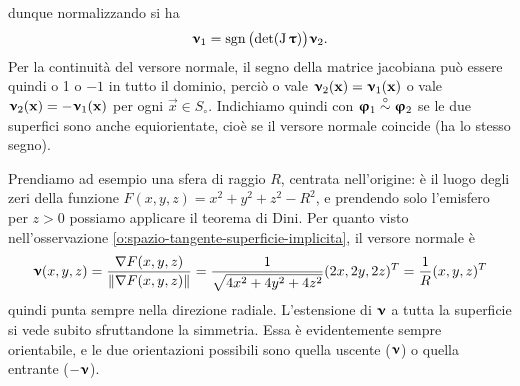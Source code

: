 dunque normalizzando si ha
\begin{equation}
	\bm{\upnu}_1=\operatorname{sgn}\big(\!\det(\operatorname{J}\bm{\uptau})\big)\bm{\upnu}_2.
	\label{eq:versore-normale-riparametrizzazione}
\end{equation}
Per la continuità del versore normale, il segno della matrice jacobiana può essere quindi o 1 o $-1$ in tutto il dominio, perciò o vale $\bm{\upnu}_2(\mathbf{x})=\bm{\upnu}_1(\mathbf{x})$ o vale $\bm{\upnu}_2(\mathbf{x})=-\bm{\upnu}_1(\mathbf{x})$ per ogni $\vec x\in S_\circ$.
Indichiamo quindi con $\bm{\upvarphi}_1\overset{\circ}{\sim}\bm{\upvarphi}_2$ se le due superfici sono anche equiorientate, cioè se il versore normale coincide (ha lo stesso segno).

Prendiamo ad esempio una sfera di raggio $R$, centrata nell'origine: è il luogo degli zeri della funzione $F(x,y,z)=x^2+y^2+z^2-R^2$, e prendendo solo l'emisfero per $z>0$ possiamo applicare il teorema di Dini.
Per quanto visto nell'osservazione \ref{o:spazio-tangente-superficie-implicita}, il versore normale è
\begin{equation}
	\bm{\upnu}(x,y,z)=\frac{\nabla F(x,y,z)}{\lVert\nabla F(x,y,z)\rVert}=\frac1{\sqrt{4x^2+4y^2+4z^2}}(2x,2y,2z)^T=\frac1{R}(x,y,z)^T
\end{equation}
quindi punta sempre nella direzione radiale.
L'estensione di $\bm{\upnu}$ a tutta la superficie si vede subito sfruttandone la simmetria.
Essa è evidentemente sempre orientabile, e le due orientazioni possibili sono quella uscente ($\bm{\upnu}$) o quella entrante ($-\bm{\upnu}$).

